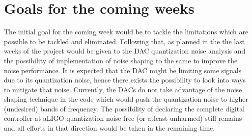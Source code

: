 \documentclass[colorlinks=true,pdfstartview=FitV,linkcolor=blue,
            citecolor=red,urlcolor=magenta]{ligodoc}
\begin{document}
\section{Goals for the coming weeks}
The initial goal for the coming week would be to tackle the limitations which are possible to be tackled and eliminated. Following that, as planned in the \cite{proposal} the last weeks of the project would be given to the DAC quantization noise analysis and the possibility of implementation of noise shaping to the same to improve the noise performance. It is expected that the DAC might be limiting some signals due to its quantization noise, hence there exists the possibility to look into ways to mitigate that noise. Currently, the DACs do not take advantage of the noise shaping technique in the code which would push the quantization noise to higher (undesired) bands of frequency. The possibility of declaring the complete digital controller at aLIGO quantization noise free (or atleast unharmed) still remains and all efforts in that direction would be taken in the remaining time.
%
\end{document}
